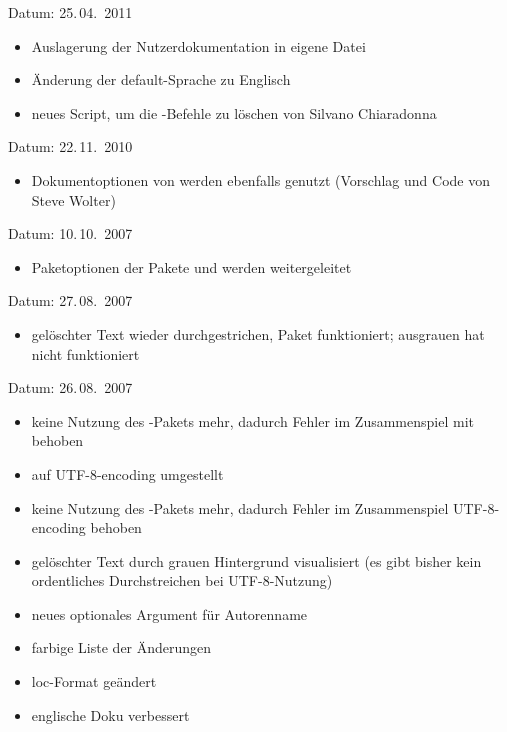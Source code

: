
Datum: 25.\,04.~2011
\begin{itemize}
	\item Auslagerung der Nutzerdokumentation in eigene Datei
	\item Änderung der default-Sprache zu Englisch
	\item neues Script, um die -Befehle zu löschen von Silvano Chiaradonna
\end{itemize}


Datum: 22.\,11.~2010
\begin{itemize}
\item Dokumentoptionen von  werden ebenfalls genutzt (Vorschlag und Code von Steve Wolter)
\end{itemize}


Datum: 10.\,10.~2007
\begin{itemize}
	\item Paketoptionen der Pakete  und  werden weitergeleitet
\end{itemize}


Datum: 27.\,08.~2007
\begin{itemize}
	\item gelöschter Text wieder durchgestrichen, Paket  funktioniert; ausgrauen hat nicht funktioniert
\end{itemize}


Datum: 26.\,08.~2007
\begin{itemize}
	\item keine Nutzung des -Pakets mehr, dadurch Fehler im Zusammenspiel mit  behoben
	\item auf UTF-8-encoding umgestellt
	\item keine Nutzung des -Pakets mehr, dadurch Fehler im Zusammenspiel UTF-8-encoding behoben
	\item gelöschter Text durch grauen Hintergrund visualisiert (es gibt bisher kein ordentliches Durchstreichen bei UTF-8-Nutzung)
	\item neues optionales Argument für Autorenname
	\item farbige Liste der Änderungen
	\item loc-Format geändert
	\item englische Doku verbessert
\end{itemize}

